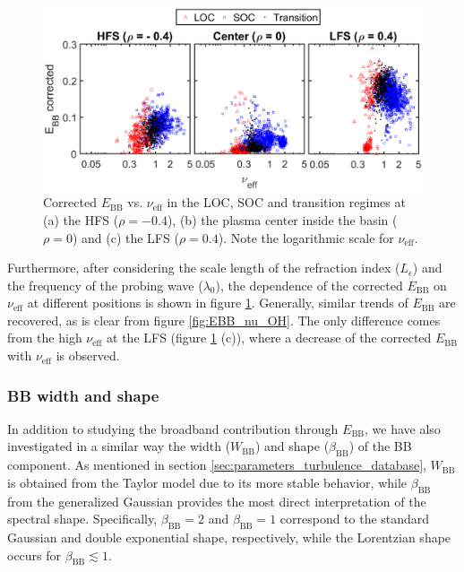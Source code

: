 \begin{figure}[h]
\begin{centering}
\includegraphics[scale=0.72]{fig_EBBc_nu_OH.eps}
\par\end{centering}
\caption{Corrected $E_\mathrm{BB}$ vs. $\nu_\mathrm{eff}$ in the LOC, SOC and transition regimes at (a) the HFS ($\rho = -0.4$), (b) the plasma center inside the basin ($\rho = 0$) and (c) the LFS ($\rho = 0.4$). Note the logarithmic scale for $\nu_\mathrm{eff}$.}
\label{fig:EBBc_nu_OH}
\end{figure}


Furthermore, after considering the scale length of the refraction index ($L_{\epsilon}$) and the frequency of the probing wave ($\lambda_0$), the dependence of the corrected $E_\mathrm{BB}$ on $\nu_\mathrm{eff}$ at different positions is shown in figure \ref{fig:EBBc_nu_OH}. Generally, similar trends of $E_\mathrm{BB}$ are recovered, as is clear from figure \ref{fig:EBB_nu_OH}. The only difference comes from the high $\nu_\mathrm{eff}$ at the LFS (figure \ref{fig:EBBc_nu_OH} (c)), where a decrease of the corrected $E_\mathrm{BB}$ with $\nu_\mathrm{eff}$ is observed.





\subsubsection{BB width and shape}

In addition to studying the broadband contribution through $E_\mathrm{BB}$, we have also investigated in a similar way the width ($W_\mathrm{BB}$) and shape ($\beta_\mathrm{BB}$) of the BB component. As mentioned in section \ref{sec:parameters_turbulence_database}, $W_\mathrm{BB}$ is obtained from the Taylor model due to its more stable behavior, while $\beta_\mathrm{BB}$ from the generalized Gaussian provides the most direct interpretation of the spectral shape. Specifically, $\beta_\mathrm{BB} = 2$ and $\beta_\mathrm{BB} = 1$ correspond to the standard Gaussian and double exponential shape, respectively, while the Lorentzian shape occurs for $\beta_\mathrm{BB}\lesssim 1$.

